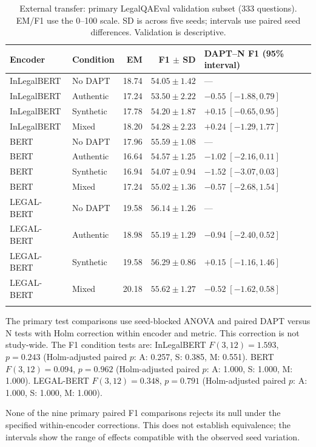 \documentclass[pdflatex,sn-basic]{sn-jnl}
\begin{document}
\begin{table}[!htbp]
\caption{External transfer: primary LegalQAEval validation subset (333 questions).
EM/F1 use the 0--100 scale. SD is across five seeds; intervals
use paired seed differences. Validation is descriptive.}
\label{tab:legalqaeval_val}
\centering\scriptsize
\setlength{\tabcolsep}{3pt}
\begin{tabular}{@{}llrr>{\raggedright\arraybackslash}p{3.8cm}@{}}
\toprule
Encoder & Condition & EM & F1 $\pm$ SD & DAPT--N F1 (95\% interval) \\
\midrule
InLegalBERT & No DAPT & 18.74 & $54.05\pm1.42$ & --- \\
InLegalBERT & Authentic & 17.24 & $53.50\pm2.22$ & $-0.55\;[-1.88,0.79]$ \\
InLegalBERT & Synthetic & 17.78 & $54.20\pm1.87$ & $+0.15\;[-0.65,0.95]$ \\
InLegalBERT & Mixed & 18.20 & $54.28\pm2.23$ & $+0.24\;[-1.29,1.77]$ \\
\addlinespace
BERT & No DAPT & 17.96 & $55.59\pm1.08$ & --- \\
BERT & Authentic & 16.64 & $54.57\pm1.25$ & $-1.02\;[-2.16,0.11]$ \\
BERT & Synthetic & 16.94 & $54.07\pm0.94$ & $-1.52\;[-3.07,0.03]$ \\
BERT & Mixed & 17.24 & $55.02\pm1.36$ & $-0.57\;[-2.68,1.54]$ \\
\addlinespace
LEGAL-BERT & No DAPT & 19.58 & $56.14\pm1.26$ & --- \\
LEGAL-BERT & Authentic & 18.98 & $55.19\pm1.29$ & $-0.94\;[-2.40,0.52]$ \\
LEGAL-BERT & Synthetic & 19.58 & $56.29\pm0.86$ & $+0.15\;[-1.16,1.46]$ \\
LEGAL-BERT & Mixed & 20.18 & $55.62\pm1.27$ & $-0.52\;[-1.62,0.58]$ \\
\addlinespace
\bottomrule
\end{tabular}
\end{table}

The primary test comparisons use seed-blocked ANOVA and paired
DAPT versus N tests with Holm correction within encoder and metric.
This correction is not study-wide. The F1 condition tests are:
InLegalBERT $F(3,12)=1.593$, $p=0.243$ (Holm-adjusted paired $p$: A: 0.257, S: 0.385, M: 0.551).
BERT $F(3,12)=0.094$, $p=0.962$ (Holm-adjusted paired $p$: A: 1.000, S: 1.000, M: 1.000).
LEGAL-BERT $F(3,12)=0.348$, $p=0.791$ (Holm-adjusted paired $p$: A: 1.000, S: 1.000, M: 1.000).

None of the nine primary paired F1 comparisons rejects its null
under the specified within-encoder corrections. This does not
establish equivalence; the intervals show the range of effects
compatible with the observed seed variation.
\end{document}
